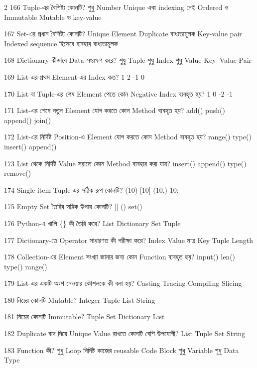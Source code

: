 \begin{multicols}{2}
\mcq
{166}
{Tuple-এর বৈশিষ্ট্য কোনটি?}
{শুধু Number}
{Unique এবং indexing নেই}
{Ordered ও Immutable}
{Mutable ও key-value}

\mcqwide
{167}
{Set-এর প্রধান বৈশিষ্ট্য কোনটি?}
{Unique Element}
{Duplicate বাধ্যতামূলক}
{Key-value pair}
{Indexed sequence হিসেবে ব্যবহার বাধ্যতামূলক}

\mcq
{168}
{Dictionary কীভাবে Data সংরক্ষণ করে?}
{শুধু Tuple}
{শুধু Index}
{শুধু Value}
{Key–Value Pair}

\mcq
{169}
{List-এর প্রথম Element-এর Index কত?}
{1}
{2}
{-1}
{0}

\mcq
{170}
{List বা Tuple-এর শেষ Element পেতে কোন Negative Index ব্যবহৃত হয়?}
{1}
{0}
{-2}
{-1}

\mcq
{171}
{List-এর শেষে নতুন Element যোগ করতে কোন Method ব্যবহৃত হয়?}
{add()}
{push()}
{append()}
{join()}

\mcq
{172}
{List-এর নির্দিষ্ট Position-এ Element যোগ করতে কোন Method ব্যবহৃত হয়?}
{range()}
{type()}
{insert()}
{append()}

\mcq
{173}
{List থেকে নির্দিষ্ট Value সরাতে কোন Method ব্যবহার করা যায়?}
{insert()}
{append()}
{type()}
{remove()}

\mcq
{174}
{Single-item Tuple-এর সঠিক রূপ কোনটি?}
{(10)}
{[10]}
{(10,)}
{{10:}}

\mcq
{175}
{Empty Set তৈরির সঠিক উপায় কোনটি?}
{[]}
{()}
{{}}
{set()}

\mcqwide
{176}
{Python-এ খালি \textenglish{\ttfamily \{\}} কী তৈরি করে?}
{List}
{Dictionary}
{Set}
{Tuple}

\mcq
{177}
{Dictionary-তে  Operator সাধারণত কী পরীক্ষা করে?}
{Index}
{Value মাত্র}
{Key}
{Tuple Length}

\mcq
{178}
{Collection-এর Element সংখ্যা জানার জন্য কোন Function ব্যবহৃত হয়?}
{input()}
{len()}
{type()}
{range()}

\mcq
{179}
{List-এর একটি অংশ নেওয়ার কৌশলকে কী বলা হয়?}
{Casting}
{Tracing}
{Compiling}
{Slicing}

\mcq
{180}
{নিচের কোনটি Mutable?}
{Integer}
{Tuple}
{List}
{String}

\mcq
{181}
{নিচের কোনটি Immutable?}
{Tuple}
{Set}
{Dictionary}
{List}

\mcq
{182}
{Duplicate বাদ দিয়ে Unique Value রাখতে কোনটি বেশি উপযোগী?}
{List}
{Tuple}
{Set}
{String}

\mcqwide
{183}
{Function কী?}
{শুধু Loop}
{নির্দিষ্ট কাজের reusable Code Block}
{শুধু Variable}
{শুধু Data Type}


\end{multicols}
